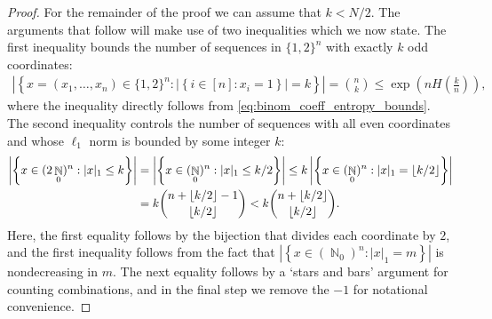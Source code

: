 \documentclass[11pt]{article}
\numberwithin{equation}{section}
\DeclareMathOperator{\N}{\mathbb{N}} %
\theoremstyle{definition}
\begin{document}
\begin{proof}
For the remainder of the proof we can assume that $k < N/2$. The arguments that follow will make use of two inequalities which we now state. 
The first inequality 
bounds the number of sequences in $\{1,2\}^{n}$ with exactly $k$ odd coordinates: 
\begin{align}\label{eq:odd_even_count}
    \left| \left\{ x=(x_1,\ldots,x_n) \in \{1,2\}^n : \left| \left\{ i \in [n] : x_i = 1 \right\} \right|=k \right\} \right| = \binom{n}{k} \leq \exp \left( n H\left( \frac{k}{n} \right) \right),
\end{align}
where the inequality directly follows from \eqref{eq:binom_coeff_entropy_bounds}. 
The second inequality controls the number of sequences with all even coordinates and whose $\ell_{1}$ norm is bounded by some integer $k$:
\begin{align}
    \notag \left| \left\{ x \in (2\N_0)^{n} : |x|_1 \leq k \right\} \right| 
    &= \left| \left\{ x \in (\N_0)^{n} : |x|_1 \leq k/2 \right\} \right|
    \leq k \left| \left\{ x \in (\N_0)^{n} : |x|_1 = \lfloor k/2 \rfloor \right\} \right| \\
    &= k \binom{n + \lfloor k/2 \rfloor -1}{ \lfloor k/2 \rfloor} 
    < k \binom{n + \lfloor k/2 \rfloor }{ \lfloor k/2 \rfloor}. \label{eq:useful_ineq_two}
\end{align}
Here, the first equality follows by the bijection that divides each coordinate by $2$, 
and the first inequality follows from the fact that 
$\left| \left\{ x \in (\N_0)^{n} : |x|_1 = m \right\} \right|$
is nondecreasing in $m$. 
The next equality follows by a `stars and bars' argument for counting combinations, and in the final step we remove the $-1$ for notational convenience.



\end{proof}
\end{document}
